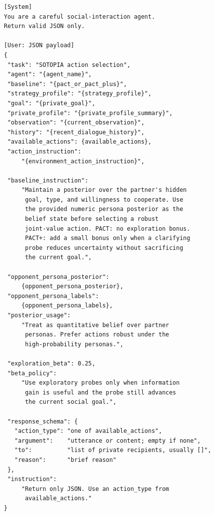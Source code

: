 \begin{lstlisting}[style=prompt]
[System]
You are a careful social-interaction agent.
Return valid JSON only.

[User: JSON payload]
{
 "task": "SOTOPIA action selection",
 "agent": "{agent_name}",
 "baseline": "{pact_or_pact_plus}",
 "strategy_profile": "{strategy_profile}",
 "goal": "{private_goal}",
 "private_profile": "{private_profile_summary}",
 "observation": "{current_observation}",
 "history": "{recent_dialogue_history}",
 "available_actions": {available_actions},
 "action_instruction":
     "{environment_action_instruction}",

 "baseline_instruction":
     "Maintain a posterior over the partner's hidden
      goal, type, and willingness to cooperate. Use
      the provided numeric persona posterior as the
      belief state before selecting a robust
      joint-value action. PACT: no exploration bonus.
      PACT+: add a small bonus only when a clarifying
      probe reduces uncertainty without sacrificing
      the current goal.",

 "opponent_persona_posterior":
     {opponent_persona_posterior},
 "opponent_persona_labels":
     {opponent_persona_labels},
 "posterior_usage":
     "Treat as quantitative belief over partner
      personas. Prefer actions robust under the
      high-probability personas.",

 "exploration_beta": 0.25,
 "beta_policy":
     "Use exploratory probes only when information
      gain is useful and the probe still advances
      the current social goal.",

 "response_schema": {
   "action_type": "one of available_actions",
   "argument":    "utterance or content; empty if none",
   "to":          "list of private recipients, usually []",
   "reason":      "brief reason"
 },
 "instruction":
     "Return only JSON. Use an action_type from
      available_actions."
}
\end{lstlisting}


